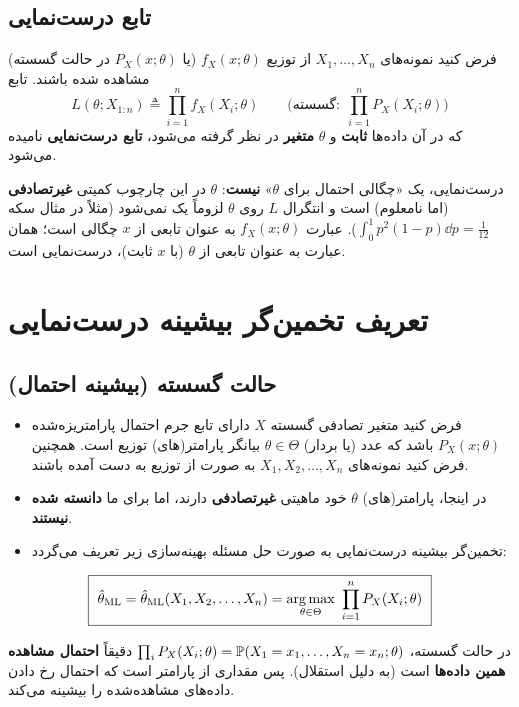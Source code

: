 \subsection{تابع درست‌نمایی}
\begin{definition}
فرض کنید نمونه‌های  $X_1,\ldots,X_n$ از توزیع $f_X(x;\theta)$ (یا $P_X(x;\theta)$ در حالت گسسته) مشاهده شده باشند. تابع
\[
L(\theta;X_{1:n})\triangleq\prod_{i=1}^nf_X(X_i;\theta)\qquad\Big(\text{گسسته:}\ \ \prod_{i=1}^nP_X(X_i;\theta)\Big)
\]
که در آن داده‌ها \textbf{ثابت} و $\theta$ \textbf{متغیر} در نظر گرفته می‌شود، \textbf{تابع درست‌نمایی}  نامیده می‌شود.
\end{definition}

\begin{warning}
\warntitle درست‌نمایی، یک «چگالی احتمال برای $\theta$» \textbf{نیست}: $\theta$ در این چارچوب کمیتی \textbf{غیرتصادفی} (اما نامعلوم) است و انتگرال $L$ روی $\theta$ لزوماً یک نمی‌شود (مثلاً در مثال سکه $\int_0^1p^2(1-p)\dd p=\frac1{12}$). عبارت $f_X(x;\theta)$ به عنوان تابعی از $x$ چگالی است؛ همان عبارت به عنوان تابعی از $\theta$ (با $x$ ثابت)، درست‌نمایی است.
\end{warning}

\section{تعریف تخمین‌گر بیشینه درست‌نمایی}

\subsection{حالت گسسته (بیشینه احتمال)}
\begin{itemize}
\item فرض کنید متغیر تصادفی گسسته $X$ دارای تابع جرم احتمال  پارامتریزه‌شده $P_X(x;\theta)$ باشد که عدد (یا بردار) $\theta\in\Theta$ بیانگر پارامتر(های) توزیع است. همچنین فرض کنید نمونه‌های $X_1,X_2,\ldots,X_n$ به صورت  از توزیع به دست آمده باشند.
\item در اینجا، پارامتر(های) $\theta$ خود ماهیتی \textcolor{red!70!black}{\textbf{غیرتصادفی}} دارند، اما برای ما \textbf{دانسته شده نیستند}.
\item تخمین‌گر بیشینه درست‌نمایی  به صورت حل مسئله بهینه‌سازی زیر تعریف می‌گردد:
\end{itemize}
\begin{definition}
\[
\boxed{\ \hat\theta_\ML=\hat\theta_\ML(X_1,X_2,\ldots,X_n)=\argmax_{\theta\in\Theta}\ \prod_{i=1}^nP_X(X_i;\theta)\ }
\]
\end{definition}
در حالت گسسته، $\prod_iP_X(X_i;\theta)=\mathbb{P}(X_1=x_1,\ldots,X_n=x_n;\theta)$ دقیقاً \textbf{احتمال مشاهده همین داده‌ها} است (به دلیل استقلال). پس  مقداری از پارامتر است که احتمال رخ دادن داده‌های مشاهده‌شده را بیشینه می‌کند.

